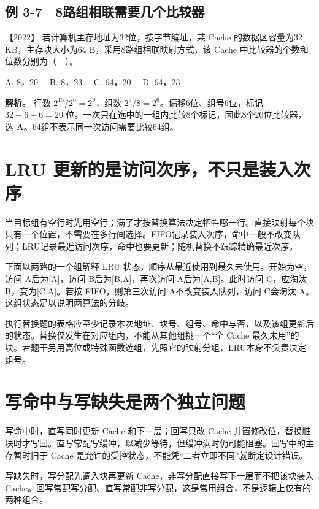 \subsection{例 3-7　8路组相联需要几个比较器}\label{co-ex3-7}

\noindent{}【2022】 若计算机主存地址为32位，按字节编址，某 Cache 的数据区容量为32 KB，主存块大小为64 B，采用8路组相联映射方式，该 Cache 中比较器的个数和位数分别为（　）。

A. 8，20　 B. 8，23　 C. 64，20　 D. 64，23


\textbf{解析。} 行数 \(2^{15}/2^6=2^9\)，组数 \(2^9/8=2^6\)。偏移6位、组号6位，标记 \(32-6-6=20\) 位。一次只在选中的一组内比较8个标记，因此8个20位比较器，选 \textbf{A}。64组不表示同一次访问需要比较64组。

\section{LRU 更新的是访问次序，不只是装入次序}\label{co-03-09}

当目标组有空行时先用空行；满了才按替换算法决定牺牲哪一行。直接映射每个块只有一个位置，不需要在多行间选择。FIFO记录装入次序，命中一般不改变队列；LRU记录最近访问次序，命中也要更新；随机替换不跟踪精确最近次序。

下面以两路的一个组解释 LRU 状态，顺序从最近使用到最久未使用。开始为空，访问 A后为{[}A{]}，访问 B后为{[}B,A{]}，再次访问 A后为{[}A,B{]}。此时访问 C，应淘汰 B，变为{[}C,A{]}。若按 FIFO，则第三次访问 A不改变装入队列，访问 C会淘汰 A。这组状态足以说明两算法的分歧。

执行替换题的表格应至少记录本次地址、块号、组号、命中与否，以及该组更新后的状态。替换仅发生在对应组内，不能从其他组挑一个``全 Cache 最久未用''的块。若题干另用高位或特殊函数选组，先照它的映射分组，LRU本身不负责决定组号。

\section{写命中与写缺失是两个独立问题}\label{co-03-10}

写命中时，直写同时更新 Cache 和下一层；回写只改 Cache 并置修改位，替换脏块时才写回。直写常配写缓冲，以减少等待，但缓冲满时仍可能阻塞。回写中的主存暂时旧于 Cache 是允许的受控状态，不能凭``二者立即不同''就断定设计错误。

写缺失时，写分配先调入块再更新 Cache，非写分配直接写下一层而不把该块装入 Cache。回写常配写分配、直写常配非写分配，这是常用组合，不是逻辑上仅有的两种组合。

